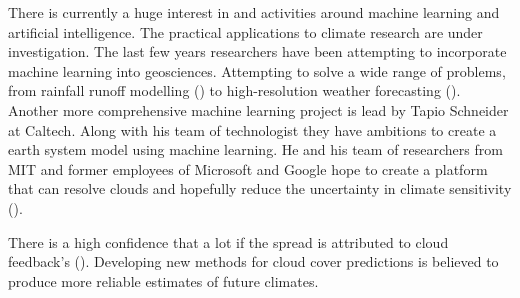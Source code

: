 There is currently a huge interest in and activities around machine learning and artificial intelligence.
The practical applications to climate research are under investigation. The last few years researchers have been attempting to incorporate machine learning into geosciences. Attempting to solve a wide range of problems, from rainfall runoff modelling (\cite{hess-23-5089-2019}) to  high-resolution weather forecasting (\cite{Rodrigues2018DeepDownscale:Forecast}).
Another more comprehensive machine learning project is lead by Tapio Schneider at Caltech. Along with his team of technologist they have ambitions to create a earth system model using machine learning. He and his team of researchers from MIT and former employees of Microsoft and Google hope to create a platform that can resolve clouds and hopefully reduce the uncertainty in climate sensitivity  (\cite{Voosen2018ScienceIntelligence}).

There is a high confidence that a lot if the spread is attributed to cloud feedback's (\cite{IPCC_CH9_climate_models}). Developing new methods for cloud cover predictions is believed to produce more reliable estimates of future climates.




